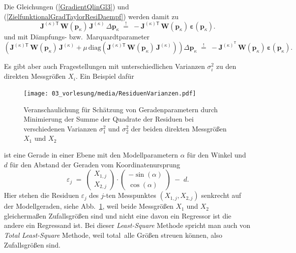 Die Gleichungen (\ref{GradientQlinGl3}) und (\ref{ZielfunktionalGradTaylorResiDaempf})
werden damit zu
\begin{equation}
 \boldsymbol{J}^{(\kappa) \textsf{T}} \, \mathbf{W}(\mathbf{p}_\kappa) \, 
\boldsymbol{J}^{(\kappa)} \, \Delta \mathbf{p}_\kappa
\; \overset{!}{=} \; 
-  \boldsymbol{J}^{(\kappa) \textsf{T}} \, \mathbf{W}(\mathbf{p}_\kappa) \, 
\boldsymbol{\varepsilon}(\mathbf{p}_\kappa) .
\label{GradientQlinGl3W}
\end{equation}
und mit Dämpfungs- bzw.\ Marquardtparameter
\begin{equation}
\left(
\boldsymbol{J}^{(\kappa) \textsf{T}} \, \mathbf{W}(\mathbf{p}_\kappa) \, \boldsymbol{J}^{(\kappa)}
 + \mu \, \mathrm{diag}(\boldsymbol{J}^{(\kappa) \textsf{T}} \, \mathbf{W}(\mathbf{p}_\kappa) \, \boldsymbol{J}^{(\kappa)}) \right) \Delta \mathbf{p}_\kappa \;
\overset{!}{=} \; - \boldsymbol{J}^{(\kappa)^\textsf{T}} \, 
\mathbf{W}(\mathbf{p}_\kappa) \, \boldsymbol{\varepsilon}(\mathbf{p}_\kappa) .
\label{ZielfunktionalGradTaylorResiDaempfW}
\end{equation}

Es gibt aber auch Fragestellungen mit unterschiedlichen Varianzen $\sigma_i^2$ 
zu den direkten Messgrößen $X_i$. Ein Beispiel dafür
\begin{figure}
\begin{center}
\texttt{[image: 03\_vorlesung/media/ResiduenVarianzen.pdf]}
\end{center}
\caption{Veranschaulichung für Schätzung von Geradenparametern durch
Minimierung der Summe der Quadrate der Residuen bei verschiedenen Varianzen 
$\sigma_1^2$ und $\sigma_2^2$ der beiden direkten Messgrößen $X_1$ und $X_2$
\label{ResiduenVarianzen}}
\end{figure}
ist eine Gerade in einer Ebene mit den Modellparametern $\alpha$ für den Winkel und
$d$ für den Abstand der Geraden vom Koordinatenursprung
\begin{equation}
\varepsilon_j \; = \; 
\left(\begin{array}{c} X_{1,j}\\ X_{2,j}\end{array}\right) \cdot
\left(\begin{array}{c} -\sin(\alpha)\\ \cos(\alpha)\end{array}\right) \; - \; d .
\label{TLSgerade}
\end{equation}
Hier stehen die Residuen $\varepsilon_j$ des $j$-ten Messpunktes $(X_{1,j}, X_{2,j})$ 
senkrecht auf der Modellgeraden, siehe Abb.~\ref{ResiduenVarianzen}, weil beide
Messgrößen $X_1$ und $X_2$ gleichermaßen Zufallsgrößen sind und nicht eine davon
ein Regressor ist die andere ein Regressand ist. Bei dieser \textsl{Least-Square} Methode
spricht man auch von \textsl{Total Least-Square} Methode, weil \glqq total\grqq ~alle Größen
streuen können, also Zufallsgrößen sind.

